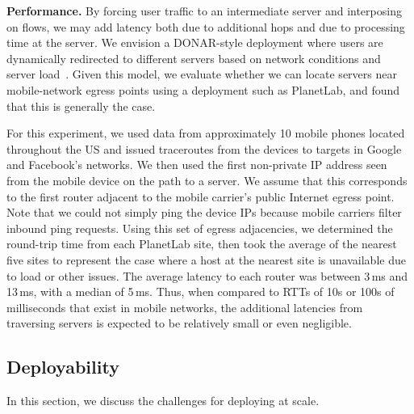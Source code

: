 \noindent\textbf{Performance.} By forcing user traffic to an
intermediate server and interposing on flows, we may add latency both
due to additional hops and due to processing time at the \meddle
server. We envision a DONAR-style deployment where users are
dynamically redirected to different \meddle servers based on network
conditions and server load~\cite{wendell:donar}. Given this model, we
evaluate whether we can locate servers near mobile-network egress
points using a deployment such as PlanetLab, and found that this is
generally the case.

For this experiment, 
we used data from approximately 10 mobile phones located throughout
the US and issued traceroutes from the devices to targets in Google
and Facebook's networks. We then used the first non-private IP address seen 
from the mobile device on the path to a server. We assume that this corresponds 
to the first router adjacent to the mobile carrier's public Internet egress point. Note that we could not simply ping the device IPs because mobile carriers filter inbound ping requests. Using this set of egress adjacencies, we determined the round-trip time from each PlanetLab site, then took the average of the nearest five sites to represent the case where a host at the nearest site is unavailable due to load or other issues. The average latency to each router was between 3\,ms and 13\,ms, with a median of 5\,ms. Thus, when compared to RTTs of 10s or 100s of milliseconds that exist in mobile networks, the additional latencies from traversing \meddle servers is expected to be relatively small or even negligible.



\subsection{Deployability}
In this section, we discuss the challenges for deploying \meddle at scale. 

